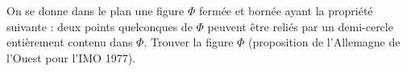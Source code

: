 On se donne dans le plan une figure $\Phi$ fermée et bornée ayant la propriété suivante : deux points quelconques de $\Phi$ peuvent être reliés par un demi-cercle entièrement contenu dans $\Phi$. Trouver la figure $\Phi$ (proposition de l'Allemagne de l'Ouest pour l'IMO 1977).
